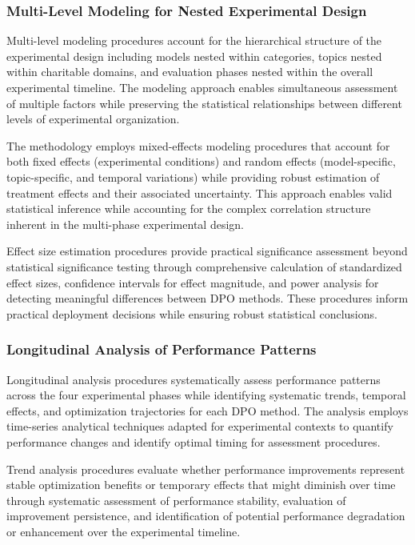 \subsubsection{Multi-Level Modeling for Nested Experimental Design}

Multi-level modeling procedures account for the hierarchical structure of the experimental design including models nested within categories, topics nested within charitable domains, and evaluation phases nested within the overall experimental timeline. The modeling approach enables simultaneous assessment of multiple factors while preserving the statistical relationships between different levels of experimental organization.

The methodology employs mixed-effects modeling procedures that account for both fixed effects (experimental conditions) and random effects (model-specific, topic-specific, and temporal variations) while providing robust estimation of treatment effects and their associated uncertainty. This approach enables valid statistical inference while accounting for the complex correlation structure inherent in the multi-phase experimental design.

Effect size estimation procedures provide practical significance assessment beyond statistical significance testing through comprehensive calculation of standardized effect sizes, confidence intervals for effect magnitude, and power analysis for detecting meaningful differences between DPO methods. These procedures inform practical deployment decisions while ensuring robust statistical conclusions.

\subsubsection{Longitudinal Analysis of Performance Patterns}

Longitudinal analysis procedures systematically assess performance patterns across the four experimental phases while identifying systematic trends, temporal effects, and optimization trajectories for each DPO method. The analysis employs time-series analytical techniques adapted for experimental contexts to quantify performance changes and identify optimal timing for assessment procedures.

Trend analysis procedures evaluate whether performance improvements represent stable optimization benefits or temporary effects that might diminish over time through systematic assessment of performance stability, evaluation of improvement persistence, and identification of potential performance degradation or enhancement over the experimental timeline.

